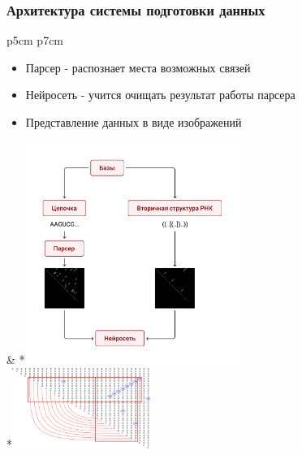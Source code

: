 \documentclass{beamer}
\begin{document}
\begin{frame}[fragile]
\transwipe[direction=90]
\frametitle{Архитектура системы подготовки данных}
\begin{tabular}{p{5cm} p{7cm}}
	\begin{itemize}
		\item Парсер - распознает места возможных связей
		\item Нейросеть - учится очищать результат работы парсера
		\item Представление данных в виде изображений
	\end{itemize} &
	*{\!\includegraphics[width=7cm]{pictures/diag2.pdf}}\\
	*{\!\includegraphics[width=4.5cm]{../pics/4.pdf}}
\end{tabular}

\end{frame}
\end{document}
